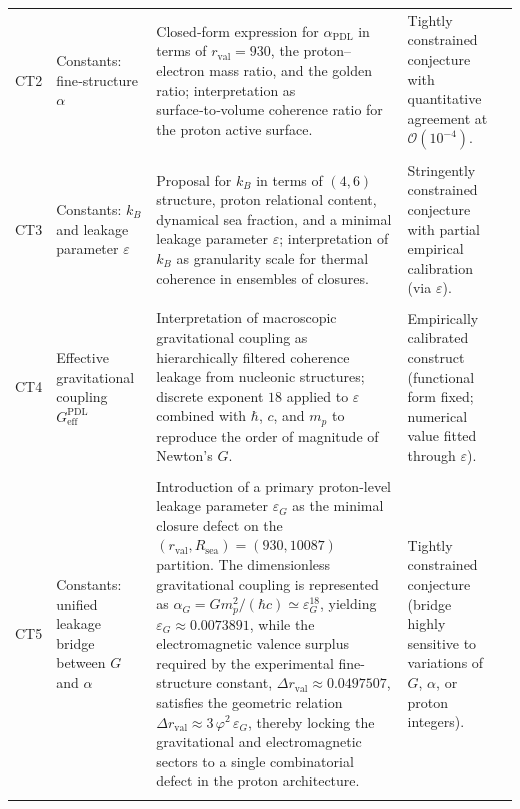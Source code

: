 \documentclass[11pt,a4paper]{article}
\newcommand{\PDL}{\mathrm{PDL}}
\begin{document}
\begin{longtable}{L{0.8cm}L{1.9cm}L{5.9cm}L{3cm}L{2.2cm}}
CT2 &
Constants: fine‑structure $\alpha$ &
Closed‑form expression for $\alpha_{\PDL}$ in terms of $r_{\mathrm{val}}=930$, the proton–electron mass ratio, and the golden ratio; interpretation as surface‑to‑volume coherence ratio for the proton active surface. &
Tightly constrained conjecture with quantitative agreement at $\mathcal{O}(10^{-4})$. &
\citep{Alpha_PDL_v2_2026,Born_Golden_v2_2026,PDL_intro,PDL_position} \\\\[0.4em]

CT3 &
Constants: $k_B$ and leakage parameter $\varepsilon$ &
Proposal for $k_B$ in terms of $(4,6)$ structure, proton relational content, dynamical sea fraction, and a minimal leakage parameter $\varepsilon$; interpretation of $k_B$ as granularity scale for thermal coherence in ensembles of closures. &
Stringently constrained conjecture with partial empirical calibration (via $\varepsilon$). &
\citep{PDL_Main_2026,Coherence_Leakage_18_2026,PDL_position} \\\\[0.4em]

CT4 &
Effective gravitational coupling $G_{\mathrm{eff}}^{\PDL}$ &
Interpretation of macroscopic gravitational coupling as hierarchically filtered coherence leakage from nucleonic structures; discrete exponent $18$ applied to $\varepsilon$ combined with $\hbar$, $c$, and $m_p$ to reproduce the order of magnitude of Newton’s $G$. &
Empirically calibrated construct (functional form fixed; numerical value fitted through $\varepsilon$). &
\citep{Exponent_18_PDL_2026,Coherence_Leakage_18_2026,PDL_Main_2026,PDL_position} \\\\[0.4em]

CT5 &
Constants: unified leakage bridge between $G$ and $\alpha$ &
Introduction of a primary proton-level leakage parameter $\varepsilon_G$ as the minimal closure defect on the $(r_{\mathrm{val}},R_{\mathrm{sea}})=(930,10087)$ partition. The dimensionless gravitational coupling is represented as $\alpha_G = G m_p^2 / (\hbar c) \simeq \varepsilon_G^{18}$, yielding $\varepsilon_G \approx 0.0073891$, while the electromagnetic valence surplus required by the experimental fine-structure constant, $\Delta r_{\mathrm{val}} \approx 0.0497507$, satisfies the geometric relation $\Delta r_{\mathrm{val}} \approx 3\,\varphi^2\,\varepsilon_G$, thereby locking the gravitational and electromagnetic sectors to a single combinatorial defect in the proton architecture. &
Tightly constrained conjecture (bridge highly sensitive to variations of $G$, $\alpha$, or proton integers). &
\citep{Exponent_18_PDL_2026,Alpha_PDL_v2_2026,Universal_Coherence_Leakage_V3_2026} \\\\[0.4em]



\end{longtable}
\end{document}
